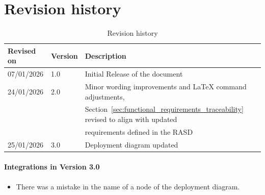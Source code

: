 \section{Revision history}
\label{sec:revision_history}%
\begin{table}[H]
\begin{center}
\begin{tabular}{ |l|l|l|}
\hline
\textbf{Revised on} & \textbf{Version}   & \textbf{Description}                           \\
\hline
07/01/2026          & 1.0   & Initial Release of the document  \\
\hline
24/01/2026 & 2.0 & Minor wording improvements and LaTeX command adjustments, \\ & & Section~\ref{sec:functional_requirements_traceability} revised to align with updated \\ & & requirements defined in the RASD \\
\hline
25/01/2026 & 3.0 & Deployment diagram updated\\
\hline
\end{tabular}
\caption{Revision history}
\label{tab:revision_history}%
\end{center}
\end{table}
\paragraph{Integrations in Version 3.0}
\begin{itemize}

    \item There was a mistake in the name of a node of the deployment diagram.

    
\end{itemize}

\setcounter{bib}{1}
\newcommand{\cbib} {\thebib\stepcounter{bib}}

